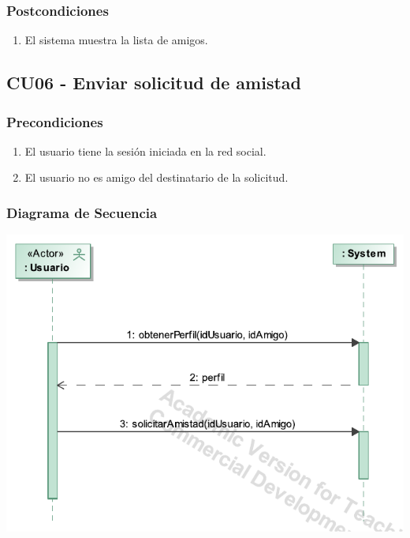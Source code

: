 \documentclass[12pt, a4paper, titlepage]{article}
\begin{document}
\subsubsection{Postcondiciones}
\begin{enumerate}
	\item El sistema muestra la lista de amigos.
\end{enumerate}



\subsection{CU06 - Enviar solicitud de amistad}

\subsubsection{Precondiciones}
\begin{enumerate}
	\item El usuario tiene la sesión iniciada en la red social.
	\item El usuario no es amigo del destinatario de la solicitud.
\end{enumerate}

\subsubsection{Diagrama de Secuencia}
\begin{center}
	\includegraphics[width=\textwidth]{Imagenes/Enviar_solicitud_amistad}
\end{center}
\end{document}
